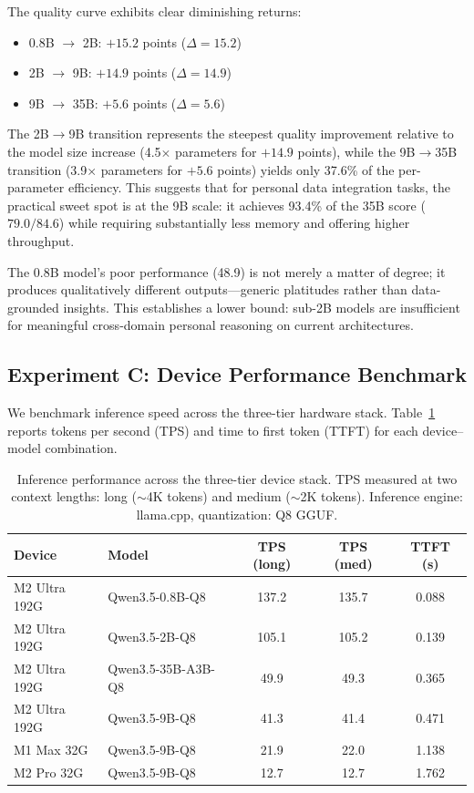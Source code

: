 \documentclass[11pt,a4paper]{article}
\begin{document}
The quality curve exhibits clear diminishing returns:
\begin{itemize}[leftmargin=*,itemsep=2pt]
  \item 0.8B $\to$ 2B: $+15.2$ points ($\Delta = 15.2$)
  \item 2B $\to$ 9B: $+14.9$ points ($\Delta = 14.9$)
  \item 9B $\to$ 35B: $+5.6$ points ($\Delta = 5.6$)
\end{itemize}

The 2B$\to$9B transition represents the steepest quality improvement relative
to the model size increase (4.5$\times$ parameters for $+14.9$ points), while
the 9B$\to$35B transition (3.9$\times$ parameters for $+5.6$ points) yields
only 37.6\% of the per-parameter efficiency. This suggests that for personal
data integration tasks, the practical sweet spot is at the 9B scale: it
achieves 93.4\% of the 35B score ($79.0/84.6$) while requiring substantially
less memory and offering higher throughput.

The 0.8B model's poor performance (48.9) is not merely a matter of degree;
it produces qualitatively different outputs---generic platitudes rather than
data-grounded insights. This establishes a lower bound: sub-2B models are
insufficient for meaningful cross-domain personal reasoning on current
architectures.


\subsection{Experiment C: Device Performance Benchmark}
\label{sec:results:benchmark}

We benchmark inference speed across the three-tier hardware stack.
Table~\ref{tab:benchmark} reports tokens per second (TPS) and time to first
token (TTFT) for each device--model combination.

\begin{table}[H]
\centering
\caption{Inference performance across the three-tier device stack. TPS measured
at two context lengths: long ($\sim$4K tokens) and medium ($\sim$2K tokens).
Inference engine: llama.cpp, quantization: Q8 GGUF.}
\label{tab:benchmark}
\begin{tabular}{@{}llccc@{}}
\toprule
\textbf{Device} & \textbf{Model} & \textbf{TPS (long)} & \textbf{TPS (med)} & \textbf{TTFT (s)} \\
\midrule
M2 Ultra 192G & Qwen3.5-0.8B-Q8    & 137.2 & 135.7 & 0.088 \\
M2 Ultra 192G & Qwen3.5-2B-Q8      & 105.1 & 105.2 & 0.139 \\
M2 Ultra 192G & Qwen3.5-35B-A3B-Q8 & 49.9  & 49.3  & 0.365 \\
M2 Ultra 192G & Qwen3.5-9B-Q8      & 41.3  & 41.4  & 0.471 \\
\midrule
M1 Max 32G    & Qwen3.5-9B-Q8      & 21.9  & 22.0  & 1.138 \\
M2 Pro 32G    & Qwen3.5-9B-Q8      & 12.7  & 12.7  & 1.762 \\
\bottomrule
\end{tabular}
\end{table}
\end{document}
